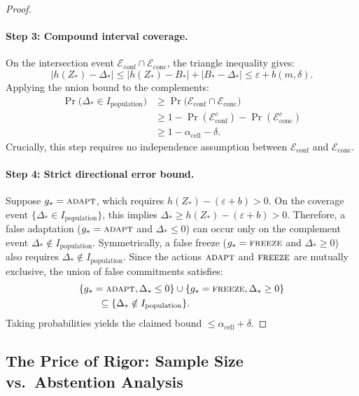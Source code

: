 \begin{proof}
\paragraph{Step 3: Compound interval coverage.}
On the intersection event $\mathcal E_{\mathrm{conf}} \cap \mathcal E_{\mathrm{conc}}$, the triangle inequality gives:
\[
 |h(Z_*) - \Delta_*| \le |h(Z_*) - B_*| + |B_* - \Delta_*| \le \varepsilon + b(m, \delta).
\]
Applying the union bound to the complements:
\begin{align*}
 \Pr\bigl(\Delta_* \in I_{\mathrm{population}}\bigr)
 &\ge \Pr\bigl(\mathcal E_{\mathrm{conf}} \cap \mathcal E_{\mathrm{conc}}\bigr) \\
 &\ge 1 - \Pr(\mathcal E_{\mathrm{conf}}^c) - \Pr(\mathcal E_{\mathrm{conc}}^c) \\
 &\ge 1 - \alpha_{\mathrm{cell}} - \delta.
\end{align*}
Crucially, this step requires no independence assumption between $\mathcal E_{\mathrm{conf}}$ and $\mathcal E_{\mathrm{conc}}$.

\paragraph{Step 4: Strict directional error bound.}
Suppose $g_* = \textnormal{\textsc{adapt}}$, which requires $h(Z_*) - (\varepsilon + b) > 0$. On the coverage event
$\{\Delta_* \in I_{\mathrm{population}}\}$, this implies $\Delta_* \ge h(Z_*) - (\varepsilon + b) > 0$.
Therefore, a false adaptation ($g_* = \textnormal{\textsc{adapt}}$ and $\Delta_* \le 0$) can occur only on the complement event
$\Delta_* \notin I_{\mathrm{population}}$. Symmetrically, a false freeze ($g_* = \textnormal{\textsc{freeze}}$ and $\Delta_* \ge 0$)
also requires $\Delta_* \notin I_{\mathrm{population}}$. Since the actions $\textnormal{\textsc{adapt}}$ and $\textnormal{\textsc{freeze}}$ are mutually
exclusive, the union of false commitments satisfies:
\begin{align*}
 &\{g_* = \textnormal{\textsc{adapt}}, \Delta_* \le 0\} \cup \{g_* = \textnormal{\textsc{freeze}}, \Delta_* \ge 0\} \\
 &\qquad\subseteq \{\Delta_* \notin I_{\mathrm{population}}\}.
\end{align*}
Taking probabilities yields the claimed bound $\le \alpha_{\mathrm{cell}} + \delta$.
\end{proof}

\subsection{The Price of Rigor: Sample Size vs.\ Abstention Analysis}
\label{app:price-of-rigor}

